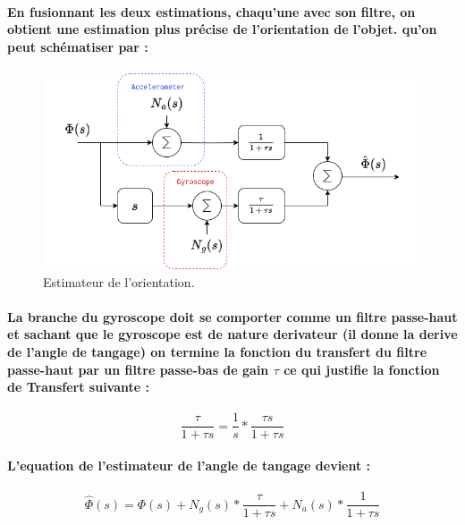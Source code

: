 \paragraph{En fusionnant les deux estimations, chaqu'une avec son filtre, on obtient une estimation plus précise de l'orientation de l'objet. qu'on peut schématiser par :}
\paragraph*{}

\begin{figure}[!htpb]
	\centering
	\includegraphics[width=\linewidth]{Figures/pitch-estimation.png}
	\caption{Estimateur de l'orientation.}
\end{figure}

\paragraph{La branche du gyroscope doit se comporter comme un filtre passe-haut et sachant que le gyroscope est de nature derivateur (il donne la derive de l'angle de tangage) on termine la fonction du transfert du filtre passe-haut par un filtre passe-bas de gain $\tau$ ce qui justifie la fonction de Transfert suivante :}

\begin{equation}
	\frac{\tau}{1 + \tau s} = \frac{1}{s} * \frac{\tau s}{1 + \tau s}
\end{equation}

\paragraph{L'equation de l'estimateur de l'angle de tangage devient :}

\begin{equation}
	\hat{\Phi}(s) = \Phi(s) + N_g(s) * \frac{\tau}{1 + \tau s} + N_a(s) * \frac{1}{1 + \tau s}
\end{equation}

